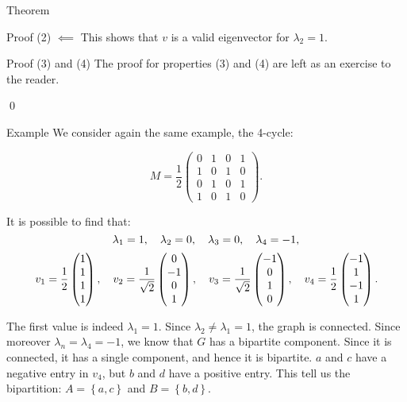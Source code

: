 \documentclass[a4paper]{article}
\begin{document}
\begin{parag}{Theorem}
\begin{subparag}{Proof (2) $\impliedby$}
        This shows that $v$ is a valid eigenvector for $\lambda_2 = 1$.
    \end{subparag}

    \begin{subparag}{Proof (3) and (4)}
        The proof for properties (3) and (4) are left as an exercise to the reader.

        \qed
    \end{subparag}
\end{parag}

\begin{parag}{Example}
    We consider again the same example, the 4-cycle:
    \begin{center}
    \begin{minipage}{0.4\textwidth}
    \end{minipage}
    \begin{minipage}{0.4\textwidth}
        \[M = \frac{1}{2} \begin{pmatrix} 0 & 1 & 0 & 1 \\ 1 & 0 & 1 & 0 \\ 0 & 1 & 0 & 1 \\ 1 & 0 & 1 & 0 \end{pmatrix} .\]
    \end{minipage}
    \hfill
    \end{center}

    It is possible to find that: 
    \[\lambda_1 = 1, \quad \lambda_2 = 0, \quad \lambda_3 = 0, \quad \lambda_4 = -1,\] 
    \[v_1 = \frac{1}{2} \begin{pmatrix} 1 \\ 1 \\ 1 \\ 1 \end{pmatrix}, \quad v_2 = \frac{1}{\sqrt{2}} \begin{pmatrix} 0 \\ -1 \\ 0 \\ 1 \end{pmatrix}, \quad v_3 = \frac{1}{\sqrt{2}} \begin{pmatrix} -1 \\ 0 \\ 1 \\ 0 \end{pmatrix}, \quad v_4 = \frac{1}{2}\begin{pmatrix} -1 \\ 1 \\ -1 \\ 1 \end{pmatrix}.\]

    The first value is indeed $\lambda_1 = 1$. Since $\lambda_2 \neq \lambda_1 = 1$, the graph is connected. Since moreover $\lambda_n = \lambda_4 = -1$, we know that $G$ has a bipartite component. Since it is connected, it has a single component, and hence it is bipartite. $a$ and $c$ have a negative entry in $v_4$, but $b$ and $d$ have a positive entry. This tell us the bipartition: $A = \left\{a, c\right\}$ and $B = \left\{b, d\right\}$.
\end{parag}
\end{document}

